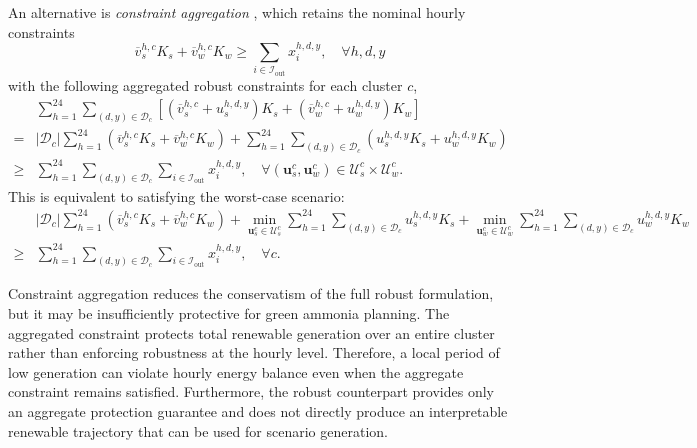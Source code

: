 \documentclass[11pt, letter]{article}
\begin{document}
An alternative is \emph{constraint aggregation} \citep{bertsimas_decarbonizing_2023}, which retains the nominal hourly constraints
\begin{equation}\label{eq:nominal_hourly}
      \overline{v}_s^{h,c} K_s + \overline{v}_w^{h,c} K_w \ge \sum_{i \in\mathcal{I}_\text{out}} x_i^{h,d,y}, \quad \forall h,d,y
\end{equation}
with the following aggregated robust constraints for each cluster $c$, 
\begin{align*}
    &\sum_{h=1}^{24}\sum_{(d,y)\in \mathcal{D}_c}\left[ (\overline{v}_s^{h,c} + u_s^{h,d,y}) K_s +  (\overline{v}_w^{h,c} + u_w^{h,d,y}) K_w\right] \\ = & |\mathcal{D}_c| \sum_{h=1}^{24}\left( \overline{v}_s^{h,c}  K_s +  \overline{v}_w^{h,c} K_w \right)+  \sum_{h=1}^{24}\sum_{(d,y)\in \mathcal{D}_c}\left( u_s^{h,d,y} K_s +   u_w^{h,d,y} K_w\right) \\\ge&  \sum_{h=1}^{24}\sum_{(d,y)\in \mathcal{D}_c}\sum_{i \in \mathcal{I}_\text{out}} x_{i}^{h,d,y}, \quad \forall (\boldsymbol{u}^{c}_s,\boldsymbol{u}^{c}_w) \in \mathcal{U}^{c}_s \times \mathcal{U}^{c}_w.
\end{align*}  
This is equivalent to satisfying the worst-case scenario:
\begin{align}\label{eq:aggregation_wc}
    & |\mathcal{D}_c|\sum_{h=1}^{24} \left( \overline{v}_s^{h,c}  K_s +  \overline{v}_w^{h,c} K_w \right) + \min_{\boldsymbol{u}_s^c \in \mathcal{U}_s^{c}} \sum_{h=1}^{24}\sum_{(d, y)\in \mathcal{D}_c} u_s^{h,d,y} K_s + \min_{\boldsymbol{u}_w^c \in \mathcal{U}_w^{c}} \sum_{h=1}^{24}\sum_{(d, y)\in \mathcal{D}_c} u_w^{h,d,y} K_w \nonumber \\ \ge&\sum_{h=1}^{24}\sum_{(d,y)\in \mathcal{D}_c} \sum_{i \in \mathcal{I}_\text{out}} x_{i}^{h,d,y} , \quad \forall c.
\end{align}

Constraint aggregation reduces the conservatism of the full robust formulation, but it may be insufficiently protective for green ammonia planning. The aggregated constraint protects total renewable generation over an entire cluster rather than enforcing robustness at the hourly level. Therefore, a local period of low generation can violate hourly energy balance even when the aggregate constraint remains satisfied. Furthermore, the robust counterpart provides only an aggregate protection guarantee and does not directly produce an interpretable renewable trajectory that can be used for scenario generation.
\end{document}
